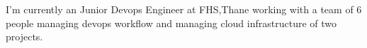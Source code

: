 \documentclass[9pt]{developercv} %
\begin{document}
\vspace{0.5cm}



\begin{minipage}[t]{1\textwidth} %
	\vspace{-\baselineskip} %
	
I'm currently an Junior Devops Engineer at FHS,Thane working with a team of 6 people managing devops workflow and managing cloud infrastructure of two projects.
\end{minipage}


\end{document}
